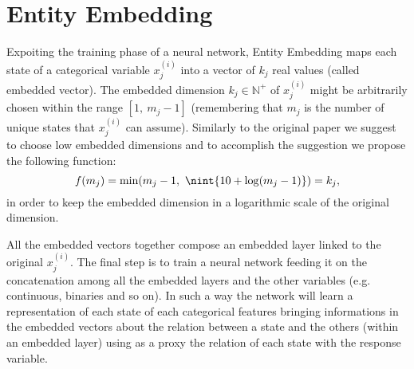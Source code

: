 \documentclass{article}
\DeclarePairedDelimiter{\nint}\lfloor\rceil
\begin{document}
\section{Entity Embedding}
Expoiting the training phase of a neural network, Entity Embedding maps each state of a categorical variable $x^{(i)}_j$ into a vector of $k_j$ real values (called embedded vector). The embedded dimension $k_j \in \mathbb{N}^+$ of $x^{(i)}_j$ might be arbitrarily chosen within the range $[1,\ m_j - 1]$ (remembering that $m_j$ is the number of unique states that $x^{(i)}_j$ can assume). Similarly to the original paper\cite{guo} we suggest to choose low embedded dimensions and to accomplish the suggestion we propose the following function:
\begin{equation}\label{eq:eq4}
    f(m_j) = \min(m_j - 1,\ \nint{10 + \log(m_j - 1)}) = k_j,
\end{equation}
in order to keep the embedded dimension in a logarithmic scale of the original dimension.

All the embedded vectors together compose an embedded layer linked to the original $x^{(i)}_j$. The final step is to train a neural network feeding it on the concatenation among all the embedded layers and the other variables (e.g. continuous, binaries and so on). In such a way the network will learn a representation of each state of each categorical features bringing informations in the embedded vectors about the relation between a state and the others (within an embedded layer) using as a proxy the relation of each state with the response variable.
\end{document}
